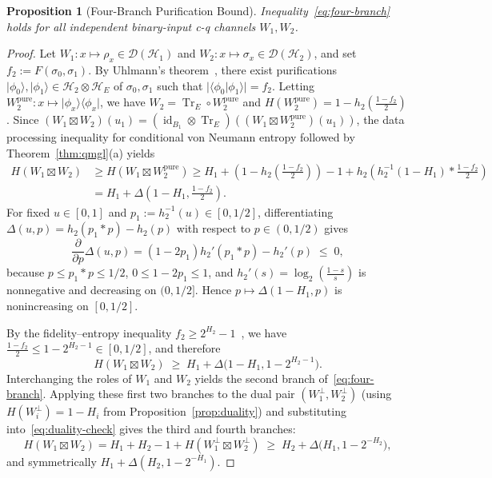 \documentclass[10pt,a4paper]{article}
\numberwithin{equation}{section}
\theoremstyle{plain}
\newtheorem{proposition}[theorem]{Proposition}
\theoremstyle{definition}
\theoremstyle{remark}
\DeclareMathOperator{\Tr}{Tr}
\DeclareMathOperator{\id}{id}
\newcommand{\cH}{\mathcal{H}}
\newcommand{\cD}{\mathcal{D}}
\newcommand{\ket}[1]{\lvert #1 \rangle}
\newcommand{\ketbra}[1]{\lvert #1 \rangle\langle #1 \rvert}
\newcommand{\braket}[2]{\langle #1 \vert #2 \rangle}
\begin{document}
\begin{proposition}[Four-Branch Purification Bound]\label{prop:four-branch}
Inequality~\eqref{eq:four-branch} holds for all independent binary-input c-q channels $W_1, W_2$.
\end{proposition}

\begin{proof}
Let $W_1 : x \mapsto \rho_x \in \cD(\cH_1)$ and $W_2 : x \mapsto \sigma_x \in \cD(\cH_2)$, and set $f_2 := F(\sigma_0, \sigma_1)$. By Uhlmann's theorem~\cite{Uhlmann1976}, there exist purifications $\ket{\phi_0}, \ket{\phi_1} \in \cH_2 \otimes \cH_E$ of $\sigma_0, \sigma_1$ such that $\lvert \braket{\phi_0}{\phi_1} \rvert = f_2$. Letting $W_2^{\mathrm{pure}} : x \mapsto \ketbra{\phi_x}$, we have $W_2 = \Tr_E \circ W_2^{\mathrm{pure}}$ and $H(W_2^{\mathrm{pure}}) = 1 - h_2(\frac{1 - f_2}{2})$. Since $(W_1 \boxtimes W_2)(u_1) = (\id_{B_1} \otimes \Tr_E)((W_1 \boxtimes W_2^{\mathrm{pure}})(u_1))$, the data processing inequality for conditional von Neumann entropy followed by Theorem~\ref{thm:qmgl}(a) yields
\begin{align*}
H(W_1 \boxtimes W_2) &\ge H(W_1 \boxtimes W_2^{\mathrm{pure}}) \ge H_1 + \left(1 - h_2\!\left(\frac{1 - f_2}{2}\right)\right) - 1 + h_2\!\left(h_2^{-1}(1 - H_1) * \frac{1 - f_2}{2}\right)\\
&= H_1 + \Delta\!\left(1 - H_1, \frac{1 - f_2}{2}\right).
\end{align*}
For fixed $u \in [0,1]$ and $p_1 := h_2^{-1}(u) \in [0, 1/2]$, differentiating $\Delta(u,p) = h_2(p_1 * p) - h_2(p)$ with respect to $p \in (0, 1/2)$ gives
\[
\frac{\partial}{\partial p}\Delta(u,p) = (1 - 2p_1) h_2'(p_1 * p) - h_2'(p) \;\le\; 0,
\]
because $p \le p_1 * p \le 1/2$, $0 \le 1 - 2p_1 \le 1$, and $h_2'(s) = \log_2(\frac{1-s}{s})$ is nonnegative and decreasing on $(0, 1/2]$. Hence $p \mapsto \Delta(1 - H_1, p)$ is nonincreasing on $[0, 1/2]$.

By the fidelity--entropy inequality $f_2 \ge 2^{H_2} - 1$~\cite[Theorem~V.3]{HircheReeb2018}, we have $\frac{1 - f_2}{2} \le 1 - 2^{H_2 - 1} \in [0, 1/2]$, and therefore
\[
H(W_1 \boxtimes W_2) \;\ge\; H_1 + \Delta\bigl(1 - H_1, 1 - 2^{H_2 - 1}\bigr).
\]
Interchanging the roles of $W_1$ and $W_2$ yields the second branch of~\eqref{eq:four-branch}. Applying these first two branches to the dual pair $(W_1^{\perp}, W_2^{\perp})$ (using $H(W_i^{\perp}) = 1 - H_i$ from Proposition~\ref{prop:duality}) and substituting into~\eqref{eq:duality-check} gives the third and fourth branches:
\[
H(W_1 \boxtimes W_2) = H_1 + H_2 - 1 + H(W_1^{\perp} \boxtimes W_2^{\perp}) \;\ge\; H_2 + \Delta\bigl(H_1, 1 - 2^{-H_2}\bigr),
\]
and symmetrically $H_1 + \Delta(H_2, 1 - 2^{-H_1})$.
\end{proof}
\end{document}
